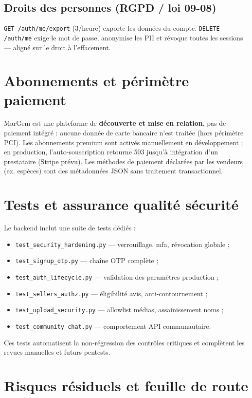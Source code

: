 \subsection{Droits des personnes (RGPD / loi 09-08)}

\texttt{GET /auth/me/export} (3/heure) exporte les données du compte. \texttt{DELETE /auth/me} exige le mot de passe, anonymise les PII et révoque toutes les sessions --- aligné sur le droit à l'effacement.

\section{Abonnements et périmètre paiement}

MarGem est une plateforme de \textbf{découverte et mise en relation}, pas de paiement intégré : aucune donnée de carte bancaire n'est traitée (hors périmètre PCI). Les abonnements premium sont activés manuellement en développement ; en production, l'auto-souscription retourne 503 jusqu'à intégration d'un prestataire (Stripe prévu). Les méthodes de paiement déclarées par les vendeurs (ex. espèces) sont des métadonnées JSON sans traitement transactionnel.

\section{Tests et assurance qualité sécurité}

Le backend inclut une suite de tests dédiés :
\begin{itemize}
  \item \texttt{test\_security\_hardening.py} --- verrouillage, \gls{mfa}, révocation globale ;
  \item \texttt{test\_signup\_otp.py} --- chaîne OTP complète ;
  \item \texttt{test\_auth\_lifecycle.py} --- validation des paramètres production ;
  \item \texttt{test\_sellers\_authz.py} --- éligibilité avis, anti-contournement ;
  \item \texttt{test\_upload\_security.py} --- allowlist médias, assainissement noms ;
  \item \texttt{test\_community\_chat.py} --- comportement API communautaire.
\end{itemize}

Ces tests automatisent la non-régression des contrôles critiques et complètent les revues manuelles et futurs pentests.

\section{Risques résiduels et feuille de route}

